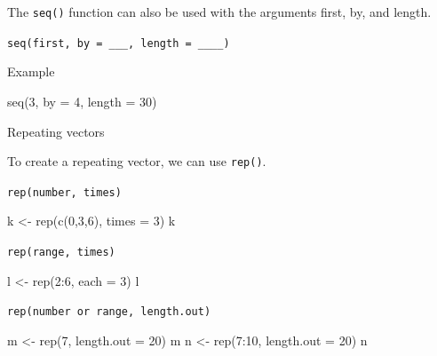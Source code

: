\documentclass[
  letterpaper,
  DIV=11,
  numbers=noendperiod]{scrreprt}
\newenvironment{Shaded}{}{}
\newcommand{\AttributeTok}[1]{\textcolor[rgb]{0.84,0.23,0.29}{#1}}
\newcommand{\DecValTok}[1]{\textcolor[rgb]{0.00,0.36,0.77}{#1}}
\newcommand{\FunctionTok}[1]{\textcolor[rgb]{0.44,0.26,0.76}{#1}}
\newcommand{\NormalTok}[1]{\textcolor[rgb]{0.14,0.16,0.18}{#1}}
\newcommand{\OtherTok}[1]{\textcolor[rgb]{0.44,0.26,0.76}{#1}}
\newcommand{\SpecialCharTok}[1]{\textcolor[rgb]{0.00,0.36,0.77}{#1}}
\begin{document}
The \texttt{seq()} function can also be used with the arguments first,
by, and length.

\texttt{seq(first,\ by\ =\ \_\_\_,\ length\ =\ \_\_\_\_)}

Example

\begin{Shaded}
\begin{Highlighting}[]
\FunctionTok{seq}\NormalTok{(}\DecValTok{3}\NormalTok{, }\AttributeTok{by =} \DecValTok{4}\NormalTok{, }\AttributeTok{length =} \DecValTok{30}\NormalTok{)}
\end{Highlighting}
\end{Shaded}

Repeating vectors

To create a repeating vector, we can use \texttt{rep()}.

\texttt{rep(number,\ times)}

\begin{Shaded}
\begin{Highlighting}[]
\NormalTok{k }\OtherTok{\textless{}{-}} \FunctionTok{rep}\NormalTok{(}\FunctionTok{c}\NormalTok{(}\DecValTok{0}\NormalTok{,}\DecValTok{3}\NormalTok{,}\DecValTok{6}\NormalTok{), }\AttributeTok{times =} \DecValTok{3}\NormalTok{)}
\NormalTok{k}
\end{Highlighting}
\end{Shaded}

\texttt{rep(range,\ times)}

\begin{Shaded}
\begin{Highlighting}[]
\NormalTok{l }\OtherTok{\textless{}{-}} \FunctionTok{rep}\NormalTok{(}\DecValTok{2}\SpecialCharTok{:}\DecValTok{6}\NormalTok{, }\AttributeTok{each =} \DecValTok{3}\NormalTok{)}
\NormalTok{l}
\end{Highlighting}
\end{Shaded}

\texttt{rep(number\ or\ range,\ length.out)}

\begin{Shaded}
\begin{Highlighting}[]
\NormalTok{m }\OtherTok{\textless{}{-}} \FunctionTok{rep}\NormalTok{(}\DecValTok{7}\NormalTok{, }\AttributeTok{length.out =} \DecValTok{20}\NormalTok{)}
\NormalTok{m}
\NormalTok{n }\OtherTok{\textless{}{-}} \FunctionTok{rep}\NormalTok{(}\DecValTok{7}\SpecialCharTok{:}\DecValTok{10}\NormalTok{, }\AttributeTok{length.out =} \DecValTok{20}\NormalTok{)}
\NormalTok{n}
\end{Highlighting}
\end{Shaded}
\end{document}
